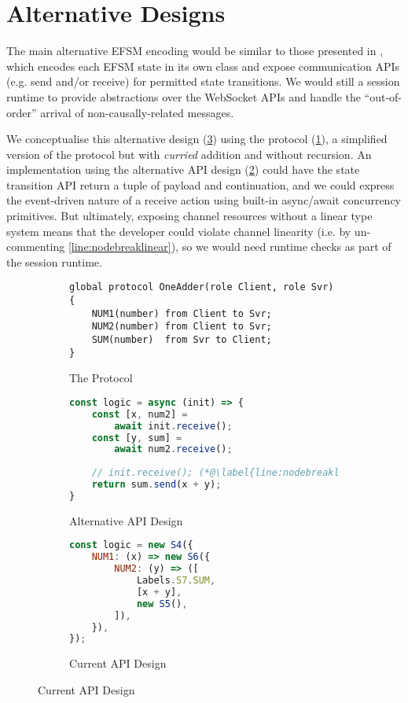 \section{Alternative Designs}
\label{section:nodealt}

The main alternative EFSM encoding would be similar to those
presented in \cite{Hybrid2016}, which encodes
each EFSM state in its own class 
and expose communication APIs (e.g. send and/or receive) 
for permitted state transitions.
We would still a session runtime to provide
abstractions over the WebSocket APIs and handle the 
``out-of-order'' arrival of non-causally-related messages.

We conceptualise this alternative design (\cref{fig:nodealt})
using the  protocol (\cref{subfig:oneadder}), 
a simplified version of the  protocol 
but with \textit{curried} addition and without recursion.
An implementation using the alternative API design
(\cref{subfig:oneadderalt}) could have the state transition 
API return a tuple of payload and continuation,
and we could express the event-driven nature of a receive action
using built-in async/await concurrency primitives.
But ultimately, exposing channel resources without a linear type system
means that the developer could violate channel linearity
(i.e. by un-commenting \cref{line:nodebreaklinear}), 
so we would need runtime checks as part of the session runtime.

\begin{figure}[!h]
\centering
\begin{subfigure}{\textwidth}
\begin{lstlisting}[language=scribble]
global protocol OneAdder(role Client, role Svr) {
	NUM1(number) from Client to Svr;
	NUM2(number) from Client to Svr;
	SUM(number)  from Svr to Client;
}
\end{lstlisting}
\caption{The  Protocol}
\label{subfig:oneadder}
\end{subfigure}
\begin{subfigure}{0.49\textwidth}
\begin{lstlisting}[language=javascript,tabsize=2]
const logic = async (init) => {
	const [x, num2] = 
		await init.receive();
 	const [y, sum] = 
 		await num2.receive();
 		
 	// init.receive(); (*@\label{line:nodebreaklinear}@*)
	return sum.send(x + y);
}
\end{lstlisting}
\caption{Alternative API Design}
\label{subfig:oneadderalt}
\end{subfigure}
\hfill
\begin{subfigure}{0.49\textwidth}
\begin{lstlisting}[language=javascript,tabsize=2]
const logic = new S4({
	NUM1: (x) => new S6({
		NUM2: (y) => ([
			Labels.S7.SUM,
			[x + y],
			new S5(),
		]),
	}),
});
\end{lstlisting}
\caption{Current API Design}
\end{subfigure}
\label{fig:nodealt}
\end{figure}

